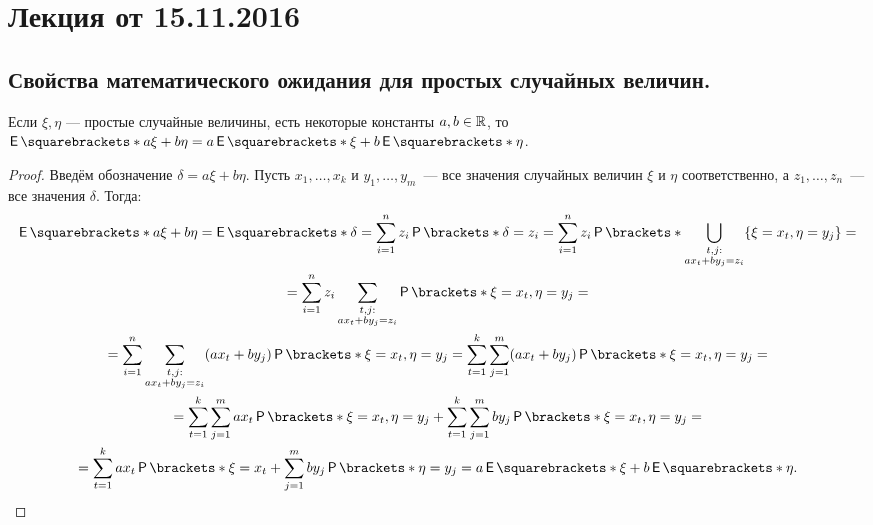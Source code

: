 \section {Лекция от 15.11.2016}

\subsection{Свойства математического ожидания для простых случайных величин.}

\begin{property}[Линейность]
	Если $ \xi, \eta $ --- простые случайные величины, есть некоторые константы 
	$ a, b \in \mathbb{R} $, то \(\E{a\xi + b\eta} = a\E{\xi} + b\E{\eta}\).
\end{property}
\begin{proof}
	Введём обозначение \(\delta = a\xi + b\eta \). Пусть \(x_1, \ldots, x_k \) 
	и \(y_1, \ldots, y_m \)~--- все значения случайных величин $ \xi $ и $ \eta 
	$ соответственно, а \(z_1, \ldots, z_n \)~--- все значения $ \delta $. 
	Тогда:
	\begin{multline*}
		\E{a\xi + b\eta} = \E{\delta} = \sum\limits_{i = 1}^{n}z_i\Pr{\delta = 
		z_i} = \sum\limits_{i = 1}^{n}z_i
		\Pr{\bigcup\limits_{\substack{t, j:\\ ax_t + by_j = z_i}}\{\xi = x_t, 
		\eta = y_j \}} = \\ =
		\sum\limits_{i = 1}^{n}z_i\sum\limits_{\substack{t, j:\\ ax_t + by_j = 
		z_i}}\Pr{\xi = x_t, \eta = y_j} = \\ =
		\sum\limits_{i = 1}^{n}\sum\limits_{\substack{t, j:\\ ax_t + by_j = 
		z_i}}(ax_t + by_j)\Pr{\xi = x_t, \eta = y_j} = 
		\sum\limits_{t = 1}^{k}\sum\limits_{j = 1}^{m}(ax_t + by_j)\Pr{\xi = 
		x_t, \eta = y_j} = \\ =
		\sum\limits_{t = 1}^{k}\sum\limits_{j = 1}^{m}ax_t\Pr{\xi = x_t, \eta = 
		y_j} +
		\sum\limits_{t = 1}^{k}\sum\limits_{j = 1}^{m}by_j\Pr{\xi = x_t, \eta = 
		y_j} = \\ =
		\sum\limits_{t = 1}^{k}ax_t\Pr{\xi = x_t} + \sum\limits_{j = 
		1}^{m}by_j\Pr{\eta = y_j} = a\E{\xi} + b\E{\eta}.
	\end{multline*}
\end{proof}

